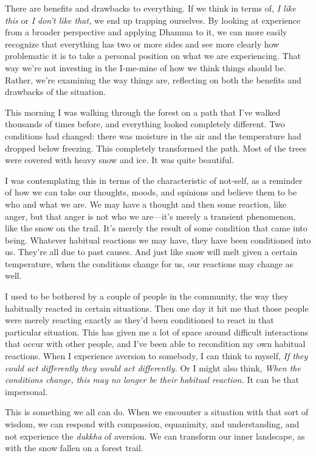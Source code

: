 There are benefits and drawbacks to everything. If we think in terms 
of, \emph{I like this} or \emph{I don't like that,} we end up trapping 
ourselves. By looking at experience from a broader perspective and 
applying Dhamma to it, we can more easily recognize that everything has 
two or more sides and see more clearly how problematic it is to take a 
personal position on what we are experiencing. That way we're not 
investing in the I-me-mine of how we think things should be. Rather, 
we're examining the way things are, reflecting on both the benefits and 
drawbacks of the situation.


This morning I was walking through the forest on a path that I've 
walked thousands of times before, and everything looked completely 
different. Two conditions had changed: there was moisture in the air 
and the temperature had dropped below freezing. This completely 
transformed the path. Most of the trees were covered with heavy snow 
and ice. It was quite beautiful.

I was contemplating this in terms of the characteristic of not-self, as 
a reminder of how we can take our thoughts, moods, and opinions and 
believe them to be who and what we are. We may have a thought and then 
some reaction, like anger, but that anger is not who we are---it's 
merely a transient phenomenon, like the snow on the trail. It's merely 
the result of some condition that came into being. Whatever habitual 
reactions we may have, they have been conditioned into us. They're all 
due to past causes. And just like snow will melt given a certain 
temperature, when the conditions change for us, our reactions may 
change as well.

I used to be bothered by a couple of people in the community, the way 
they habitually reacted in certain situations. Then one day it hit me 
that those people were merely reacting exactly as they'd been 
conditioned to react in that particular situation. This has given me a 
lot of space around difficult interactions that occur with other 
people, and I've been able to recondition my own habitual reactions. 
When I experience aversion to somebody, I can think to myself, \emph{If 
they could act differently they would act differently.} Or I might also 
think, \emph{When the conditions change, this may no longer be their 
habitual reaction.} It can be that impersonal.

This is something we all can do. When we encounter a situation with 
that sort of wisdom, we can respond with compassion, equanimity, and 
understanding, and not experience the \emph{dukkha} of aversion. We can 
transform our inner landscape, as with the snow fallen on a forest 
trail.

